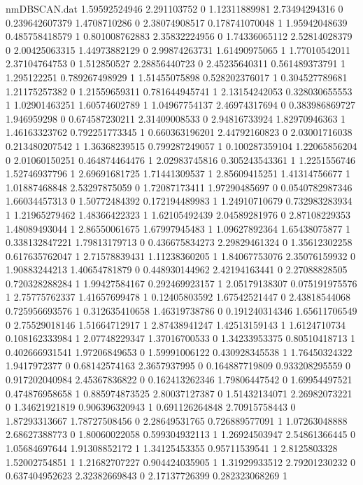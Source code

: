 \begin{filecontents}{nmDBSCAN.dat}
1.59592524946 2.291103752 0
1.12311889981 2.73494294316 0
0.239642607379 1.4708710286 0
2.38074908517 0.178741070048 1
1.95942048639 0.485758418579 1
0.801008762883 2.35832224956 0
1.74336065112 2.52814028379 0
2.00425063315 1.44973882129 0
2.99874263731 1.61490975065 1
1.77010542011 2.37104764753 0
1.512850527 2.28856440723 0
2.45235640311 0.561489373791 1
1.295122251 0.789267498929 1
1.51455075898 0.528202376017 1
0.304527789681 1.21175257382 0
1.21559659311 0.781644945741 1
2.13154242053 0.328030655553 1
1.02901463251 1.60574602789 1
1.04967754137 2.46974317694 0
0.383986869727 1.946959298 0
0.674587230211 2.31409008533 0
2.94816733924 1.82970946363 1
1.46163323762 0.792251773345 1
0.660363196201 2.44792160823 0
2.03001716038 0.213480207542 1
1.36368239515 0.799287249057 1
0.100287359104 1.22065856204 0
2.01060150251 0.464874464476 1
2.02983745816 0.305243543361 1
1.2251556746 1.52746937796 1
2.69691681725 1.71441309537 1
2.85609415251 1.41314756677 1
1.01887468848 2.53297875059 0
1.72087173411 1.97290485697 0
0.0540782987346 1.66034457313 0
1.50772484392 0.172194489983 1
1.24910710679 0.732983283934 1
1.21965279462 1.48366422323 1
1.62105492439 2.04589281976 0
2.87108229353 1.48089493044 1
2.86550061675 1.67997945483 1
1.09627892364 1.65438075877 1
0.338132847221 1.79813179713 0
0.436675834273 2.29829461324 0
1.35612302258 0.617635762047 1
2.71578839431 1.11238360205 1
1.84067753076 2.35076159932 0
1.90883244213 1.40654781879 0
0.448930144962 2.42194163441 0
2.27088828505 0.720328288284 1
1.99427584167 0.292469923157 1
2.05179138307 0.075191975576 1
2.75775762337 1.41657699478 1
0.12405803592 1.67542521447 0
2.43818544068 0.725956693576 1
0.312635410658 1.46319738786 0
0.191240314346 1.65611706549 0
2.75529018146 1.51664712917 1
2.87438941247 1.42513159143 1
1.6124710734 0.108162333984 1
2.07748229347 1.37016700533 0
1.34233953375 0.80510418713 1
0.402666931541 1.97206849653 0
1.59991006122 0.430928345538 1
1.76450324322 1.9417972377 0
0.68142574163 2.3657937995 0
0.164887719809 0.933208295559 0
0.917202040984 2.45367836822 0
0.162413262346 1.79806447542 0
1.69954497521 0.474876958658 1
0.885974873525 2.80037127387 0
1.51432134071 2.26982073221 0
1.34621921819 0.906396320943 1
0.691126264848 2.70915758443 0
1.87293313667 1.78727508456 0
2.28649531765 0.726889577091 1
1.07263048888 2.68627388773 0
1.80060022058 0.599304932113 1
1.26924503947 2.54861366445 0
1.05684697644 1.91308852172 1
1.34125453355 0.95711539541 1
2.8125803328 1.52002754851 1
1.21682707227 0.904424035905 1
1.31929933512 2.79201230232 0
0.637404952623 2.32382669843 0
2.17137726399 0.282323068269 1

\end{filecontents}
